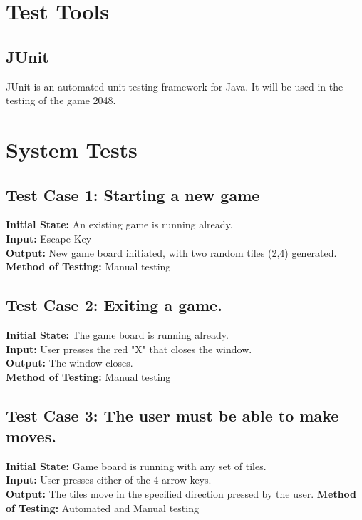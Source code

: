 \documentclass[12pt]{article}
\begin{document}
\section{Test Tools}

\subsection{JUnit}
JUnit is an automated unit testing framework for Java. It will be used in the 
testing of the game 2048.

\section{System Tests}
\subsection{Test Case 1: Starting a new game} 

\textbf{Initial State:} An existing game is running already. \\
\textbf{Input:} Escape Key\\
\textbf{Output:} New game board initiated, with two random tiles (2,4) generated. 
\textbf{Method of Testing:} Manual testing

\subsection{Test Case 2: Exiting a game.}

\textbf{Initial State:} The game board is running already.\\
\textbf{Input:} User presses the red "X" that closes the window.\\
\textbf{Output:} The window closes. \\
\textbf{Method of Testing:} Manual testing

\subsection{Test Case 3: The user must be able to make moves.}

\textbf{Initial State:} Game board is running with any set of tiles.\\
\textbf{Input:} User presses either of the 4 arrow keys.\\
\textbf{Output:} The tiles move in the specified direction pressed by the user.
\textbf{Method of Testing:} Automated and Manual testing
\end{document}
